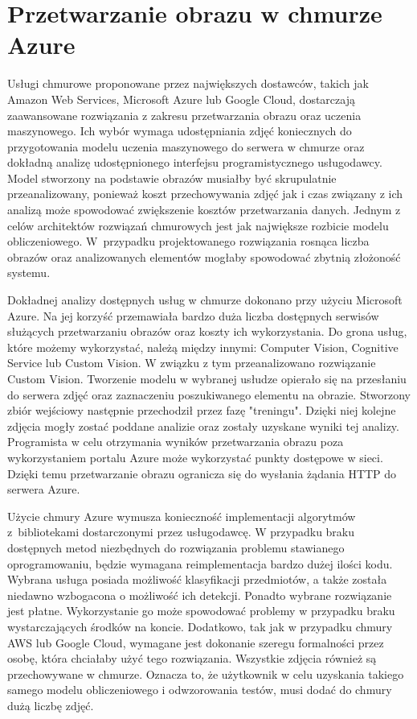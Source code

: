 \section{Przetwarzanie obrazu w chmurze Azure} {
Usługi chmurowe proponowane przez największych dostawców, takich jak Amazon Web Services, Microsoft Azure lub Google Cloud, dostarczają zaawansowane rozwiązania z zakresu przetwarzania obrazu oraz uczenia maszynowego. Ich wybór wymaga udostępniania zdjęć koniecznych do przygotowania modelu uczenia maszynowego do serwera w chmurze oraz dokładną analizę udostępnionego interfejsu programistycznego usługodawcy. Model stworzony na podstawie obrazów musiałby być skrupulatnie przeanalizowany, ponieważ koszt przechowywania zdjęć jak i czas związany z ich analizą może spowodować zwiększenie kosztów przetwarzania danych. Jednym z celów architektów rozwiązań chmurowych jest jak największe rozbicie modelu obliczeniowego. W~przypadku projektowanego rozwiązania rosnąca liczba obrazów oraz analizowanych elementów mogłaby spowodować zbytnią złożoność systemu. 

Dokładnej analizy dostępnych usług w chmurze dokonano przy użyciu Microsoft Azure. Na jej korzyść przemawiała bardzo duża liczba dostępnych serwisów służących przetwarzaniu obrazów oraz koszty ich wykorzystania. Do grona usług, które możemy wykorzystać, należą między innymi: Computer Vision, Cognitive Service lub Custom Vision. W związku z tym przeanalizowano rozwiązanie Custom Vision. Tworzenie modelu w wybranej usłudze opierało się na przesłaniu do serwera zdjęć oraz zaznaczeniu poszukiwanego elementu na obrazie. Stworzony zbiór wejściowy następnie przechodził przez fazę "treningu". Dzięki niej kolejne zdjęcia mogły zostać poddane analizie oraz zostały uzyskane wyniki tej analizy. Programista w celu otrzymania wyników przetwarzania obrazu poza wykorzystaniem portalu Azure może wykorzystać punkty dostępowe w sieci. Dzięki temu przetwarzanie obrazu ogranicza się do wysłania żądania HTTP do serwera Azure.

Użycie chmury Azure wymusza konieczność implementacji algorytmów z~bibliotekami dostarczonymi przez usługodawcę. W przypadku braku dostępnych metod niezbędnych do rozwiązania problemu stawianego oprogramowaniu, będzie wymagana reimplementacja bardzo dużej ilości kodu. Wybrana usługa posiada możliwość klasyfikacji przedmiotów, a także została niedawno wzbogacona o możliwość ich detekcji. Ponadto wybrane rozwiązanie jest płatne. Wykorzystanie go może spowodować problemy w przypadku braku wystarczających środków na koncie. Dodatkowo, tak jak w przypadku chmury AWS lub Google Cloud, wymagane jest dokonanie szeregu formalności przez osobę, która chciałaby użyć tego rozwiązania. Wszystkie zdjęcia również są przechowywane w chmurze. Oznacza to, że użytkownik w celu uzyskania takiego samego modelu obliczeniowego i odwzorowania testów, musi dodać do chmury dużą liczbę zdjęć. 

}
